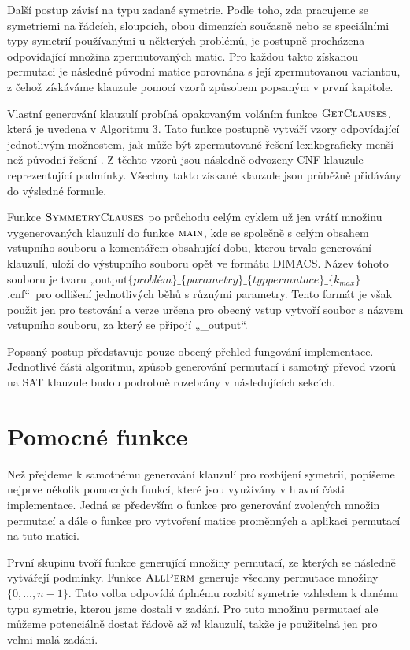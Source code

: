 Další postup závisí na typu zadané symetrie. Podle toho, zda pracujeme se symetriemi na řádcích, sloupcích, obou dimenzích současně nebo se speciálními typy symetrií používanými u některých problémů, je postupně procházena odpovídající množina zpermutovaných matic. Pro každou takto získanou permutaci je následně původní matice porovnána s její zpermutovanou variantou, z čehož získáváme klauzule pomocí vzorů způsobem popsaným v první kapitole.

Vlastní generování klauzulí probíhá opakovaným voláním funkce $\textproc{GetClauses}$, která je uvedena v Algoritmu 3. Tato funkce postupně vytváří vzory odpovídající jednotlivým možnostem, jak může být zpermutované řešení lexikograficky menší než původní řešení \cite{codish2025breakingsymmetriessetcoveringperspective}. Z těchto vzorů jsou následně odvozeny CNF klauzule reprezentující  podmínky. Všechny takto získané klauzule jsou průběžně přidávány do výsledné formule.

Funkce $\textproc{SymmetryClauses}$ po průchodu celým cyklem už jen vrátí množinu vygenerovaných klauzulí do funkce $\textproc{main}$, kde se společně s celým obsahem vstupního souboru a komentářem obsahující dobu, kterou trvalo generování klauzulí, uloží do výstupního souboru opět ve formátu DIMACS. Název tohoto souboru je tvaru „output$\{problém\}\_\{parametry\}\_\{typ permutace\}\_\{k_{max}\}$.cnf“ pro odlišení jednotlivých běhů s různými parametry. Tento formát je však použit jen pro testování a verze určena pro obecný vstup vytvoří soubor s názvem vstupního souboru, za který se připojí „\_output“.

Popsaný postup představuje pouze obecný přehled fungování implementace. Jednotlivé části algoritmu, způsob generování permutací i samotný převod vzorů na SAT klauzule budou podrobně rozebrány v následujících sekcích.

\section{Pomocné funkce}
Než přejdeme k samotnému generování klauzulí pro rozbíjení symetrií, popíšeme nejprve několik pomocných funkcí, které jsou využívány v hlavní části implementace. Jedná se především o funkce pro generování zvolených množin permutací a dále o funkce pro vytvoření matice proměnných a aplikaci permutací na tuto matici.

První skupinu tvoří funkce generující množiny permutací, ze kterých se následně vytvářejí  podmínky. Funkce $\textproc{AllPerm}$ generuje všechny permutace množiny $\{0,\ldots,n-1\}$. Tato volba odpovídá úplnému rozbití symetrie vzhledem k danému typu symetrie, kterou jsme dostali v zadání. Pro tuto množinu permutací ale můžeme potenciálně dostat řádově až $n!$ klauzulí, takže je použitelná jen pro velmi malá zadání.

